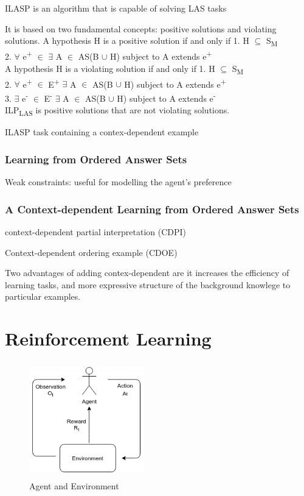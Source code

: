 \documentclass[12pt,twoside]{report}
\begin{document}
ILASP is an algorithm that is capable of solving LAS tasks

It is based on two fundamental concepts: positive solutions and violating solutions.
A hypothesis H is a positive solution if and only if
1. H $\subseteq$ S\textsubscript{M} \\
2. $\forall$ e\textsuperscript{+} $\in$ $\exists$ A $\in$ AS(B $\cup$ H) subject to A extends e\textsuperscript{+}\\

A hypothesis H is a violating solution if and only if
1. H $\subseteq$ S\textsubscript{M} \\
2. $\forall$ e\textsuperscript{+} $\in$ E\textsuperscript{+} $\exists$ A $\in$ AS(B $\cup$ H) subject to A extends e\textsuperscript{+}\\
3. $\exists$ e\textsuperscript{-} $\in$ E\textsuperscript{-} $\exists$ A $\in$ AS(B $\cup$ H) subject to A extends e\textsuperscript{-}\\


ILP\textsubscript{LAS} is positive solutions that are not violating solutions.

ILASP task containing a contex-dependent example

\subsubsection{Learning from Ordered Answer Sets}

Weak constraints: useful for modelling the agent's preference

\subsubsection{A Context-dependent Learning from Ordered Answer Sets}


context-dependent partial interpretation (CDPI)


Context-dependent ordering example (CDOE)

Two advantages of adding contex-dependent are it increases the efficiency of learning tasks, and more expressive structure of the background knowlege to particular examples.


\section{Reinforcement Learning}
\label{rl}

\begin{figure}[!htb]
\centering
\includegraphics[width=5cm, height=5cm]{./figures/agent_env}
\caption{Agent and Environment}
\label{agent_env}
\end{figure}
\end{document}
